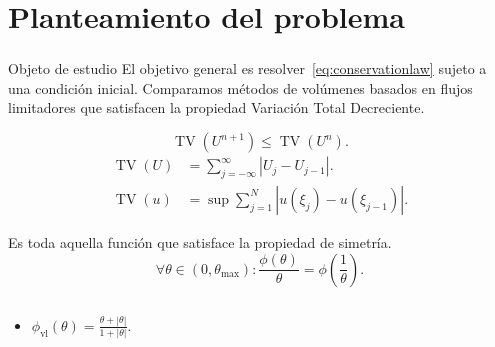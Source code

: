 \section{Planteamiento del problema}

\begin{frame}
	\frametitle{\secname}

	\begin{block}{Objeto de estudio}
		El objetivo general es resolver~\eqref{eq:conservationlaw}
		sujeto a una condición inicial.
		Comparamos métodos de volúmenes basados en flujos limitadores
		que satisfacen la propiedad \alert{Variación Total Decreciente}.
	\end{block}

	\begin{definition}
		\begin{equation*}
			\operatorname{TV}\left(U^{n+1}\right)\leq
			\operatorname{TV}\left(U^{n}\right).
		\end{equation*}
		\begin{align*}
			\operatorname{TV}\left(U\right) & =
			\sum_{j=-\infty}^{\infty}
			\left|
			U_{j}-U_{j-1}
			\right|.                            \\
			\operatorname{TV}\left(u\right) & =
			\sup\sum_{j=1}^{N}
			\left|
			u\left(\xi_{j}\right)-
			u\left(\xi_{j-1}\right)
			\right|.
		\end{align*}
	\end{definition}

	\begin{definition}
		Es toda aquella función que satisface la propiedad de simetría.
		\begin{equation}
			\forall\theta\in
			\left(0,\theta_{\max}\right):
			\frac{\phi\left(\theta\right)}{\theta}=
			\phi
			\left(\frac{1}{\theta}\right).\tag{Simetría}
		\end{equation}
	\end{definition}

	\begin{examples}
		\begin{columns}
			\begin{column}{.48\paperwidth}
				\begin{itemize}
					\item

					      \begin{math}
						      \phi_{\text{vl}}
						      \left(\theta\right)=
						      \frac{\theta+\left|\theta\right|}{1+\left|\theta\right|}
					      \end{math}.


\end{itemize}
\end{column}
\end{columns}
\end{examples}
\end{frame}
